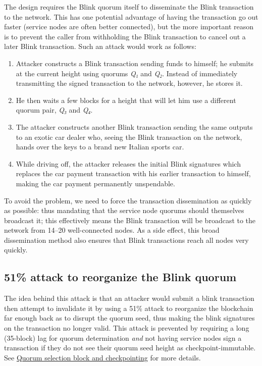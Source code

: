 The design requires the Blink quorum itself to disseminate the Blink
transaction to the network. This has one potential advantage of having
the transaction go out faster (service nodes are often better
connected), but the more important reason is to prevent the caller from
withholding the Blink transaction to cancel out a later Blink
transaction. Such an attack would work as follows:

\begin{enumerate}
\def\labelenumi{\arabic{enumi}.}
\tightlist
\item
  Attacker constructs a Blink transaction sending funds to himself; he
  submits at the current height using quorums \emph{Q₁} and \emph{Q₂}.
  Instead of immediately transmitting the signed transaction to the
  network, however, he stores it.
\item
  He then waits a few blocks for a height that will let him use a
  different quorum pair, \emph{Q₃} and \emph{Q₄}.
\item
  The attacker constructs another Blink transaction sending the same
  outputs to an exotic car dealer who, seeing the Blink transaction on
  the network, hands over the keys to a brand new Italian sports car.
\item
  While driving off, the attacker releases the initial Blink signatures
  which replaces the car payment transaction with his earlier
  transaction to himself, making the car payment permanently
  unspendable.
\end{enumerate}

To avoid the problem, we need to force the transaction dissemination as
quickly as possible: thus mandating that the service node quorums should
themselves broadcast it; this effectively means the Blink transaction
will be broadcast to the network from 14--20 well-connected nodes. As a
side effect, this broad dissemination method also ensures that Blink
transactions reach all nodes very quickly.

\hypertarget{attack-to-reorganize-the-blink-quorum}{%
\subsection{51\% attack to reorganize the Blink
quorum}\label{attack-to-reorganize-the-blink-quorum}}

The idea behind this attack is that an attacker would submit a blink
transaction then attempt to invalidate it by using a 51\% attack to
reorganize the blockchain far enough back as to disrupt the quorum seed,
thus making the blink signatures on the transaction no longer valid.
This attack is prevented by requiring a long (35-block) lag for quorum
determination \emph{and} not having service nodes sign a transaction if
they do not see their quorum seed height as checkpoint-immutable. See
\protect\hyperlink{quorum-selection-block-and-checkpointing}{Quorum
selection block and checkpointing} for more details.

